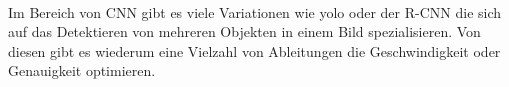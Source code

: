 \\
Im Bereich von \gls{CNN} gibt es viele Variationen wie \gls{yolo} oder der \gls{R-CNN} \parencite{yoloRCnn} die sich auf das Detektieren von mehreren Objekten in einem Bild spezialisieren. Von diesen gibt es wiederum eine Vielzahl von Ableitungen die Geschwindigkeit oder Genauigkeit optimieren.

